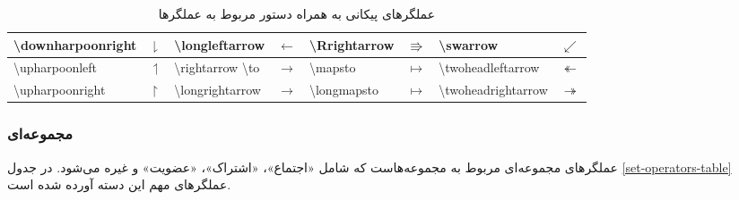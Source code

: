 \begin{table}
\begin{latin}
\begin{tabular}{|l|c||l|c||l|c||l|c|}
\textbackslash downharpoonright	&	$\downharpoonright$	&	\textbackslash longleftarrow	&	$\longleftarrow$	& 	\textbackslash Rrightarrow	 		&	$\Rrightarrow$		&	\textbackslash swarrow			&	$\swarrow$		\\ \hline
\textbackslash upharpoonleft	&	$\upharpoonleft$	&	\textbackslash rightarrow \rl{یا} \textbackslash to		&	$\rightarrow$			& 	\textbackslash mapsto 				&	$\mapsto$				&	\textbackslash twoheadleftarrow	&	$\twoheadleftarrow$ \\ \hline
\textbackslash upharpoonright	&	$\upharpoonright$	&	\textbackslash longrightarrow	&	$\longrightarrow$	& 	\textbackslash longmapsto			&	$\longmapsto$			&	\textbackslash twoheadrightarrow&	$\twoheadrightarrow$ \\ \hline
\end{tabular}
\end{latin}
\caption{عملگرهای پیکانی به همراه دستور مربوط به عملگرها}
\label{arrow-operators-table}
\end{table}

\subsubsection{مجموعه‌ای}
عملگرهای مجموعه‌ای مربوط به مجموعه‌هاست که شامل «اجتماع»، «اشتراک»، «عضویت» و
غیره می‌شود. در جدول \ref{set-operators-table} عملگرهای مهم این دسته آورده شده
است.

